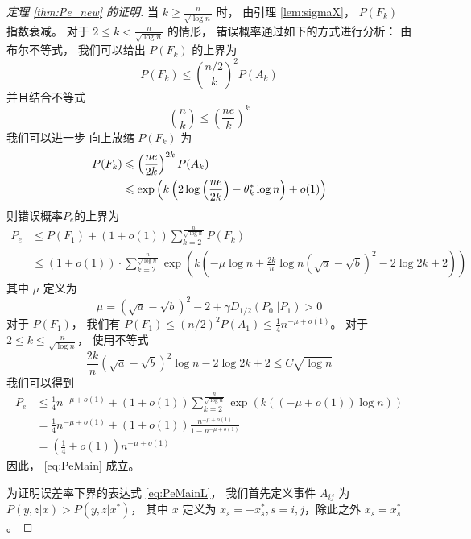 \begin{proof}[定理 \ref{thm:Pe_new} 的证明]
当 $k \geq \frac{n}{\sqrt{\log n}}$ 时，
由引理 \ref{lem:sigmaX}，
$P(F_k)$ 指数衰减。
对于 $2\leq k < \frac{n}{\sqrt{\log n}}$
的情形，
错误概率通过如下的方式进行分析：
由布尔不等式，
我们可以给出 $P(F_k)$ 的上界为
\begin{equation}\label{eq:FAk}
P(F_k) \leq \binom{n/2}{k}^2 P(A_k)
\end{equation}
并且结合不等式
\begin{equation}\label{eq:nk_binom_small}
    \binom{n}{k} \leq \left(\frac{ne}{k} \right)^k
\end{equation}
我们可以进一步 向上放缩 $P(F_k)$ 为
\begin{align}
P(F_k) & \leq \left(\frac{ne}{2k}\right)^{2k} P(A_k) 
\label{eq:P_F_k_less_A_k}\\
&\leq \exp\left(k\left(2\log
\left(\frac{ne}{2k}\right)
-\theta_k^* \log n\right) + o(1) \right)
\notag
\end{align}
则错误概率$P_e$的上界为
\begin{align*}
P_e &\leq P(F_1)+(1+o(1))\sum_{k=2}^{\frac{n}{\sqrt{\log n}}} P(F_k) \\
& \leq (1+o(1))\cdot \sum_{k=2}^{\frac{n}{\sqrt{\log n}}}
\exp\left(k\left(-\mu \log n + \frac{2k}{n} \log n\left(\sqrt{a} - \sqrt{b}\right)^2 - 2\log 2k + 2\right)
\right)
\end{align*}
其中 $\mu$ 定义为
\begin{equation}\label{eq:mu_def}
	\mu = \left(\sqrt{a} - \sqrt{b}\right)^2-2 + \gamma D_{1/2}(P_0||P_1) > 0	
\end{equation}
对于 $P(F_1)$， 我们有 $P(F_1)\leq (n/2)^2
P(A_1)\leq \frac{1}{4}n^{-\mu+o(1)}$。
对于 $2\leq k \leq \frac{n}{\sqrt{\log n}}$，
使用不等式
$$
\frac{2k}{n}\left(\sqrt{a} - \sqrt{b}\right)^2\log n -2\log2k+2\leq  C\sqrt{\log n}
$$
我们可以得到
\begin{align*}
P_e &\leq \frac{1}{4}n^{-\mu + o(1)} +(1+o(1)) \sum_{k=2}^{\frac{n}{\sqrt{\log n}}} \exp(k((-\mu + o(1)) \log n )) \\
& =\frac{1}{4}n^{-\mu + o(1)}+(1+o(1)) \frac{n^{-\mu + o(1)}}{1-n^{-\mu + o(1)}} \\
&= \left(\frac{1}{4}+o(1)\right)n^{-\mu + o(1)}
\end{align*}
因此， \eqref{eq:PeMain} 成立。

为证明误差率下界的表达式
\eqref{eq:PeMainL}，
我们首先定义事件 $A_{ij}$ 为
$P(y,z|x) > P(y,z|x^*)$，
其中 $x$ 定义为
$x_s=-x^*_s,
s=i,j$，除此之外
$x_s=x^*_s$
。


\end{proof}
